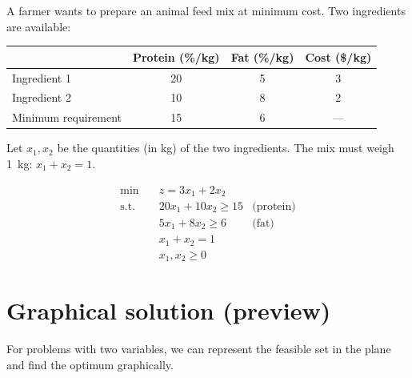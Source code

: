 \begin{example}
A farmer wants to prepare an animal feed mix at minimum cost.  Two
ingredients are available:

\begin{center}
\begin{tabular}{lccc}
  \toprule
  & Protein (\%/kg) & Fat (\%/kg) & Cost (\$/kg) \\
  \midrule
  Ingredient 1 & 20 & 5 & 3 \\
  Ingredient 2 & 10 & 8 & 2 \\
  \midrule
  Minimum requirement & 15 & 6 & --- \\
  \bottomrule
\end{tabular}
\end{center}

Let $x_1, x_2$ be the quantities (in kg) of the two ingredients.  The mix
must weigh 1~kg: $x_1 + x_2 = 1$.

\[
\begin{aligned}
  \min \quad & z = 3x_1 + 2x_2 \\
  \text{s.t.} \quad
    & 20x_1 + 10x_2 \ge 15 & \text{(protein)} \\
    & 5x_1 + 8x_2 \ge 6   & \text{(fat)} \\
    & x_1 + x_2 = 1 \\
    & x_1, x_2 \ge 0
\end{aligned}
\]
\end{example}

\section{Graphical solution (preview)}

For problems with two variables, we can represent the feasible set in the
plane and find the optimum graphically.

\begin{center}
\end{center}

